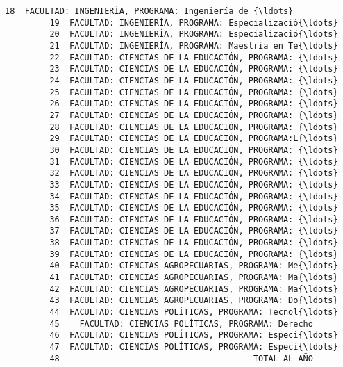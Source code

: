 \documentclass[11pt]{article}
\begin{document}
\begin{Verbatim}[commandchars=\\\{\}]
         18  FACULTAD: INGENIERÍA, PROGRAMA: Ingeniería de {\ldots}                                   
         19  FACULTAD: INGENIERÍA, PROGRAMA: Especializació{\ldots}                                   
         20  FACULTAD: INGENIERÍA, PROGRAMA: Especializació{\ldots}                                   
         21  FACULTAD: INGENIERÍA, PROGRAMA: Maestria en Te{\ldots}                                   
         22  FACULTAD: CIENCIAS DE LA EDUCACIÓN, PROGRAMA: {\ldots}                                   
         23  FACULTAD: CIENCIAS DE LA EDUCACIÓN, PROGRAMA: {\ldots}                                   
         24  FACULTAD: CIENCIAS DE LA EDUCACIÓN, PROGRAMA: {\ldots}                                   
         25  FACULTAD: CIENCIAS DE LA EDUCACIÓN, PROGRAMA: {\ldots}                                   
         26  FACULTAD: CIENCIAS DE LA EDUCACIÓN, PROGRAMA: {\ldots}                                   
         27  FACULTAD: CIENCIAS DE LA EDUCACIÓN, PROGRAMA: {\ldots}                                   
         28  FACULTAD: CIENCIAS DE LA EDUCACIÓN, PROGRAMA: {\ldots}                                   
         29  FACULTAD: CIENCIAS DE LA EDUCACIÓN, PROGRAMA:L{\ldots}                                   
         30  FACULTAD: CIENCIAS DE LA EDUCACIÓN, PROGRAMA: {\ldots}                                   
         31  FACULTAD: CIENCIAS DE LA EDUCACIÓN, PROGRAMA: {\ldots}                                   
         32  FACULTAD: CIENCIAS DE LA EDUCACIÓN, PROGRAMA: {\ldots}                                   
         33  FACULTAD: CIENCIAS DE LA EDUCACIÓN, PROGRAMA: {\ldots}                                   
         34  FACULTAD: CIENCIAS DE LA EDUCACIÓN, PROGRAMA: {\ldots}                                   
         35  FACULTAD: CIENCIAS DE LA EDUCACIÓN, PROGRAMA: {\ldots}                                   
         36  FACULTAD: CIENCIAS DE LA EDUCACIÓN, PROGRAMA: {\ldots}                                   
         37  FACULTAD: CIENCIAS DE LA EDUCACIÓN, PROGRAMA: {\ldots}                                   
         38  FACULTAD: CIENCIAS DE LA EDUCACIÓN, PROGRAMA: {\ldots}                                   
         39  FACULTAD: CIENCIAS DE LA EDUCACIÓN, PROGRAMA: {\ldots}                                   
         40  FACULTAD: CIENCIAS AGROPECUARIAS, PROGRAMA: Me{\ldots}                                   
         41  FACULTAD: CIENCIAS AGROPECUARIAS, PROGRAMA: Ma{\ldots}                                   
         42  FACULTAD: CIENCIAS AGROPECUARIAS, PROGRAMA: Ma{\ldots}                                   
         43  FACULTAD: CIENCIAS AGROPECUARIAS, PROGRAMA: Do{\ldots}                                   
         44  FACULTAD: CIENCIAS POLÍTICAS, PROGRAMA: Tecnol{\ldots}                                   
         45    FACULTAD: CIENCIAS POLÍTICAS, PROGRAMA: Derecho                                   
         46  FACULTAD: CIENCIAS POLÍTICAS, PROGRAMA: Especi{\ldots}                                   
         47  FACULTAD: CIENCIAS POLÍTICAS, PROGRAMA: Especi{\ldots}                                   
         48                                       TOTAL AL AÑO                                   
         

\end{Verbatim}
\end{document}
